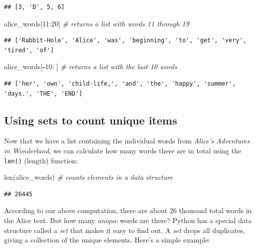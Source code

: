 \documentclass[
]{book}
\newenvironment{Shaded}{\begin{snugshade}}{\end{snugshade}}
\newcommand{\BuiltInTok}[1]{#1}
\newcommand{\CommentTok}[1]{\textcolor[rgb]{0.56,0.35,0.01}{\textit{#1}}}
\newcommand{\DecValTok}[1]{\textcolor[rgb]{0.00,0.00,0.81}{#1}}
\newcommand{\NormalTok}[1]{#1}
\newcommand{\OperatorTok}[1]{\textcolor[rgb]{0.81,0.36,0.00}{\textbf{#1}}}
\begin{document}
\begin{verbatim}
## [3, 'D', 5, 6]
\end{verbatim}

\begin{Shaded}
\begin{Highlighting}[]
\NormalTok{alice\_words[}\DecValTok{11}\NormalTok{:}\DecValTok{20}\NormalTok{] }\CommentTok{\# returns a list with words 11 through 19}
\end{Highlighting}
\end{Shaded}

\begin{verbatim}
## ['Rabbit-Hole', 'Alice', 'was', 'beginning', 'to', 'get', 'very', 'tired', 'of']
\end{verbatim}

\begin{Shaded}
\begin{Highlighting}[]
\NormalTok{alice\_words[}\OperatorTok{{-}}\DecValTok{10}\NormalTok{: ] }\CommentTok{\# returns a list with the last 10 words}
\end{Highlighting}
\end{Shaded}

\begin{verbatim}
## ['her', 'own', 'child-life,', 'and', 'the', 'happy', 'summer', 'days.', 'THE', 'END']
\end{verbatim}

\hypertarget{using-sets-to-count-unique-items}{%
\subsection{Using sets to count unique items}\label{using-sets-to-count-unique-items}}

Now that we have a list containing the individual words from \emph{Alice's Adventures in Wonderland}, we can calculate how many words there are in total using the \texttt{len()} (length) function:

\begin{Shaded}
\begin{Highlighting}[]
\BuiltInTok{len}\NormalTok{(alice\_words) }\CommentTok{\# counts elements in a data structure}
\end{Highlighting}
\end{Shaded}

\begin{verbatim}
## 26445
\end{verbatim}

According to our above computation, there are about 26 thousand total words in the Alice text. But how many \emph{unique} words are there? Python has a special data structure called a \emph{set} that makes it easy to find out. A \emph{set} drops all duplicates, giving a collection of the unique elements. Here's a simple example:
\end{document}

